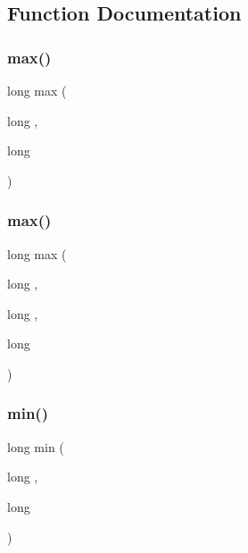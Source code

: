 \subsection{Function Documentation}
\mbox{\label{adat-devel_2lib_2SU3_2SU3__internal_8h_aa46d99c835ece03e48b683c1a1410620}} 
\subsubsection{\texorpdfstring{max()}{max()}\hspace{0.1cm}{\footnotesize\ttfamily [1/2]}}
{\footnotesize\ttfamily long max (\begin{DoxyParamCaption}\item[{long}]{,  }\item[{long}]{ }\end{DoxyParamCaption})}

\mbox{\label{adat-devel_2lib_2SU3_2SU3__internal_8h_ace7f45ceb252a2dfbf29b98bc81cb8ba}} 
\subsubsection{\texorpdfstring{max()}{max()}\hspace{0.1cm}{\footnotesize\ttfamily [2/2]}}
{\footnotesize\ttfamily long max (\begin{DoxyParamCaption}\item[{long}]{,  }\item[{long}]{,  }\item[{long}]{ }\end{DoxyParamCaption})}

\mbox{\label{adat-devel_2lib_2SU3_2SU3__internal_8h_a04318caabb1b10526b80abe98f513aa1}} 
\subsubsection{\texorpdfstring{min()}{min()}\hspace{0.1cm}{\footnotesize\ttfamily [1/3]}}
{\footnotesize\ttfamily long min (\begin{DoxyParamCaption}\item[{long}]{,  }\item[{long}]{ }\end{DoxyParamCaption})}

